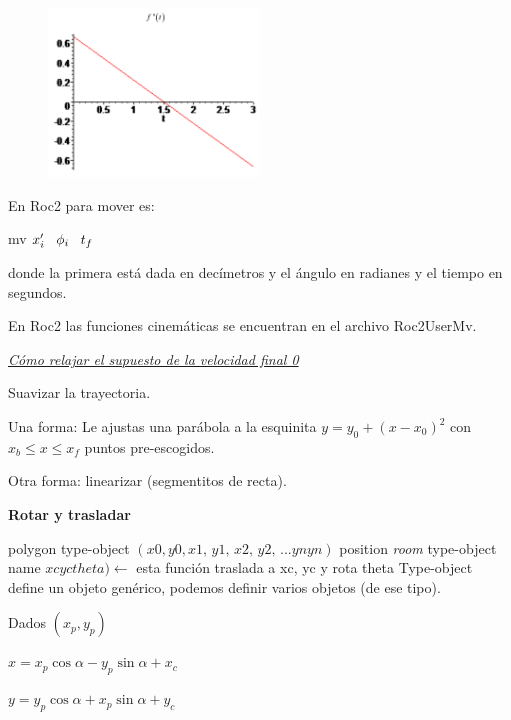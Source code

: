 \begin{figure}[h!]
	\centering
	\includegraphics[width=0.5\textwidth]{images/img68.png}
	\label{figura68}
\end{figure}


En Roc2 para mover es:

mv $x'_i \hspace{0.3cm} \phi_i\hspace{0.3cm}t_f$

donde la primera está dada en decímetros y el ángulo en radianes y el tiempo en segundos.

En Roc2 las funciones cinemáticas se encuentran en el archivo Roc2UserMv.

\underline{\textit{Cómo relajar el supuesto de la velocidad final 0}}

Suavizar la trayectoria.

\begin{scaja} 
	
	Una forma: Le ajustas una parábola a la esquinita
	$y=y_0 + (x-x_0)^2$ con $x_b \leq x \leq x_f $ puntos pre-escogidos.
	
	\vspace{5mm}
	
	Otra forma: linearizar (segmentitos de recta).
	
\end{scaja}

\textbf{Rotar y trasladar}

polygon type-object $(x0,  y0, x1, \, y1, \, x2, \, y2, \, ... yn yn)$
position \textit{room} type-object name $xc yc theta ) \leftarrow$ esta función traslada a xc, yc y rota theta
Type-object define un objeto genérico, podemos definir varios objetos (de ese tipo).

\vspace{5mm}
Dados $(x_p,y_p)$


$ x= x_p \cos\alpha - y_p \sin\alpha +x_c $

$y = y_p \cos\alpha + x_p \sin\alpha +y_c$


